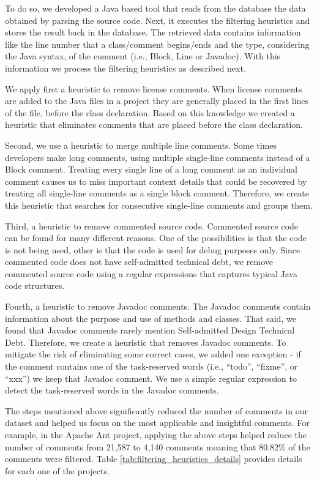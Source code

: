 To do so, we developed a Java based tool that reads from the database the data obtained by parsing the source code. Next, it executes the filtering heuristics and stores the result back in the database. The retrieved data contains information like the line number that a class/comment begins/ends and the type, considering the Java syntax, of the comment (i.e., Block, Line or Javadoc). With this information we process the filtering heuristics as described next.

We apply first a heuristic to remove license comments. When license comments are added to the Java files in a project they are generally placed in the first lines of the file, before the class declaration. Based on this knowledge we created a heuristic that eliminates comments that are placed before the class declaration. 

Second, we use a heuristic to merge multiple line comments. Some times developers make long comments, using multiple single-line comments instead of a Block comment. Treating every single line of a long comment as an individual comment causes us to miss important context details that could be recovered by treating all single-line comments as a single block comment. Therefore, we create this heuristic that searches for consecutive single-line comments and groups them.

Third, a heuristic to remove commented source code. Commented source code can be found for many different reasons. One of the possibilities is that the code is not being used, other is that the code is used for debug purposes only. Since commented code does not have self-admitted technical debt, we remove commented source code using a regular expressions that captures typical Java code structures.

Fourth, a heuristic to remove Javadoc comments. The Javadoc comments contain information about the purpose and use of methods and classes. That said, we found that Javadoc comments rarely mention Self-admitted Design Technical Debt. Therefore, we create a heuristic that removes Javadoc comments. To mitigate the risk of eliminating some correct cases, we added one exception - if the comment contains one of the task-reserved words (i.e., ``todo'', ``fixme'', or ``xxx'') we keep that Javadoc comment. We use a simple regular expression to  detect the task-reserved words in the Javadoc comments.

The steps mentioned above significantly reduced the number of comments in our dataset and helped us focus on the most applicable and insightful comments. For example, in the Apache Ant project, applying the above steps helped reduce the number of comments from 21,587 to 4,140 comments meaning that 80.82\% of the comments were filtered. Table \ref{tab:filtering_heuristics_details} provides details for each one of the projects.

